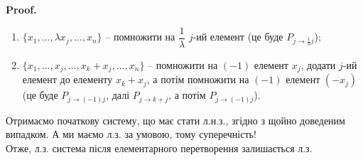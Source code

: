 \documentclass[a4paper, 10pt]{article}
\makeatletter
\theoremstyle{theoremdd}
\renewenvironment{proof}[1][Proof.\\]{\par
\pushQED{\hfill \qed}%
\normalfont \topsep6\p@\@plus6\p@\relax
\trivlist
\item\relax
{\bfseries
#1\@addpunct{.}}\hspace\labelsep\ignorespaces
}{%
\popQED\endtrivlist\@endpefalse
}
\makeatother
\begin{document}
\begin{proof}
\begin{enumerate}[nosep, wide = 0pt, label={\Roman*.}]
	\item $\{x_1, \dots, \lambda x_j, \dots, x_n\}$ -- помножити на $\dfrac{1}{\lambda}$ $j$-ий елемент (це буде $P_{j \to \frac{1}{\lambda} j}$);
	\item $\{x_1, \dots, x_j, \dots,  x_k + x_j, \dots, x_n\}$ -- помножити на $(-1)$ елемент $x_j$, додати $j$-ий елемент до елементу $x_k+x_j$, а потім помножити на $(-1)$ елемент $(-x_j)$ (це буде $P_{j \to (-1)j}$, далі $P_{j \to k+j}$, а потім $P_{j \to (-1)j}$).
	\end{enumerate}
	Отримаємо початкову систему, що має стати л.н.з., згідно з щойно доведеним випадком. А ми маємо л.з. за умовою, тому суперечність! \\
	Отже, л.з. система після елементарного перетворення залишається л.з.
	\end{proof}
	
\end{document}
